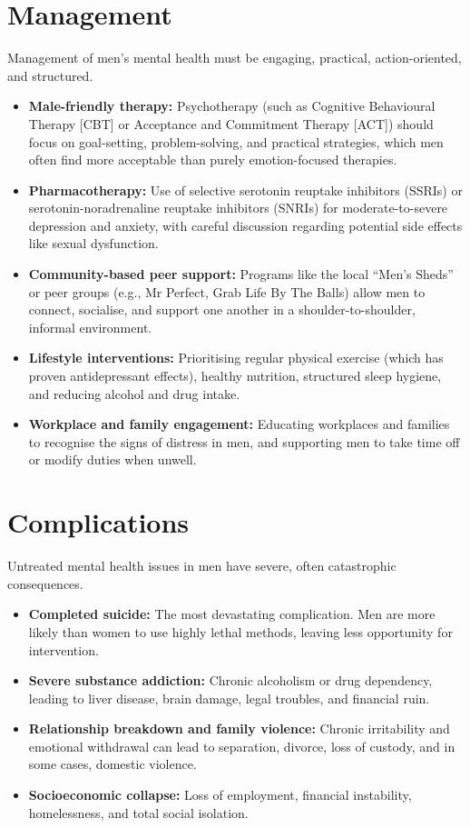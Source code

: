 \section*{Management}
Management of men's mental health must be engaging, practical, action-oriented, and structured.
\begin{itemize}
    \item \textbf{Male-friendly therapy:} Psychotherapy (such as Cognitive Behavioural Therapy [CBT] or Acceptance and Commitment Therapy [ACT]) should focus on goal-setting, problem-solving, and practical strategies, which men often find more acceptable than purely emotion-focused therapies.
    \item \textbf{Pharmacotherapy:} Use of selective serotonin reuptake inhibitors (SSRIs) or serotonin-noradrenaline reuptake inhibitors (SNRIs) for moderate-to-severe depression and anxiety, with careful discussion regarding potential side effects like sexual dysfunction.
    \item \textbf{Community-based peer support:} Programs like the local ``Men's Sheds'' or peer groups (e.g., Mr Perfect, Grab Life By The Balls) allow men to connect, socialise, and support one another in a shoulder-to-shoulder, informal environment.
    \item \textbf{Lifestyle interventions:} Prioritising regular physical exercise (which has proven antidepressant effects), healthy nutrition, structured sleep hygiene, and reducing alcohol and drug intake.
    \item \textbf{Workplace and family engagement:} Educating workplaces and families to recognise the signs of distress in men, and supporting men to take time off or modify duties when unwell.
\end{itemize}

\section*{Complications}
Untreated mental health issues in men have severe, often catastrophic consequences.
\begin{itemize}
    \item \textbf{Completed suicide:} The most devastating complication. Men are more likely than women to use highly lethal methods, leaving less opportunity for intervention.
    \item \textbf{Severe substance addiction:} Chronic alcoholism or drug dependency, leading to liver disease, brain damage, legal troubles, and financial ruin.
    \item \textbf{Relationship breakdown and family violence:} Chronic irritability and emotional withdrawal can lead to separation, divorce, loss of custody, and in some cases, domestic violence.
    \item \textbf{Socioeconomic collapse:} Loss of employment, financial instability, homelessness, and total social isolation.
\end{itemize}

